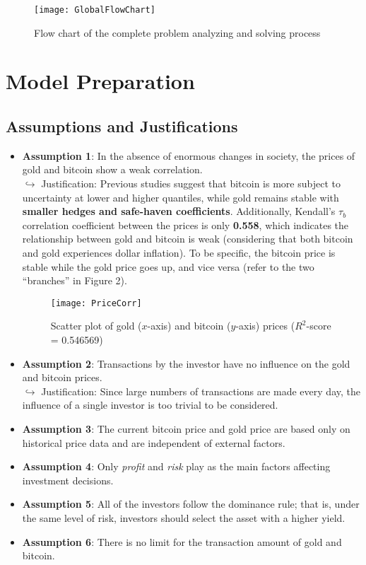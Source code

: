 \documentclass{mcmthesis}
\begin{document}
	\begin{figure}[h]
		\centering \texttt{[image: GlobalFlowChart]}
		\caption{Flow chart of the complete problem analyzing and solving process}
	\end{figure}
	
	\section{Model Preparation}
	
	\subsection{Assumptions and Justifications}
	\begin{itemize}
		\item \textbf{Assumption 1}: 
		In the absence of enormous changes in society, the prices of gold and bitcoin show a weak correlation. 
		\\ $\hookrightarrow$ Justification: 
		Previous studies suggest that bitcoin is more subject to uncertainty at lower and higher quantiles, while gold remains stable with \textbf{smaller hedges and safe-haven coefficients}. Additionally, Kendall's $\tau_b$ correlation coefficient between the prices is only \textbf{0.558}, which indicates the relationship between gold and bitcoin is weak (considering that both bitcoin and gold experiences dollar inflation). To be specific, the bitcoin price is stable while the gold price goes up, and vice versa (refer to the two ``branches'' in Figure 2). 
		
		\begin{figure}[h]
			\centering \texttt{[image: PriceCorr]}
			\caption{Scatter plot of gold ($x$-axis) and bitcoin ($y$-axis) prices ($R^2$-score = 0.546569)}
		\end{figure}
		
		\item \textbf{Assumption 2}: 
		Transactions by the investor have no influence on the gold and bitcoin prices. 
		\\ $\hookrightarrow$ Justification: 
		Since large numbers of transactions are made every day, the influence of a single investor is too trivial to be considered. 
		
		\item \textbf{Assumption 3}: 
		The current bitcoin price and gold price are based only on historical price data and are independent of external factors. 
		
		\item \textbf{Assumption 4}: 
		Only \textit{profit} and \textit{risk} play as the main factors affecting investment decisions. 
		
		\item \textbf{Assumption 5}: 
		All of the investors follow the dominance rule; that is, under the same level of risk, investors should 
		select the asset with a higher yield. 
		
		\item \textbf{Assumption 6}: 
		There is no limit for the transaction amount of gold and bitcoin. 
	\end{itemize}
		
\end{document}
